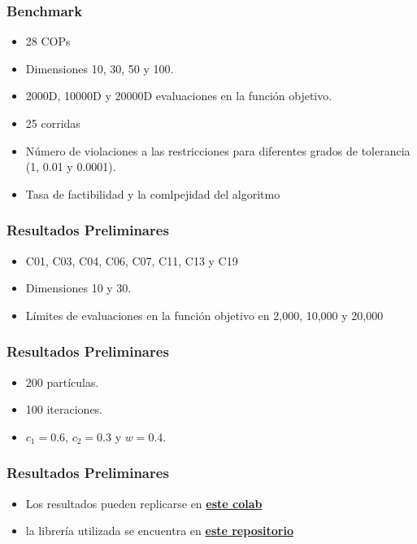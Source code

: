 \documentclass[10pt, compress]{beamer}
\begin{document}
\begin{frame}[fragile]
  \frametitle{Benchmark}
    \begin{center}
         \begin{itemize}
             \item 28 COPs
             \item Dimensiones 10, 30, 50 y 100.
             \item 2000D, 10000D y 20000D evaluaciones en la función objetivo.
             \item 25 corridas
             \item Número de violaciones a las restricciones para diferentes grados de tolerancia (1, 0.01 y 0.0001).
             \item Tasa de factibilidad y la comlpejidad del algoritmo
         \end{itemize}{}
    \end{center}{}
\end{frame}

\begin{frame}[fragile]
  \frametitle{Resultados Preliminares }
    \begin{center}
         \begin{itemize}
             \item C01, C03, C04, C06, C07, C11, C13 y C19
             \item Dimensiones 10 y 30. 
             \item Límites de evaluaciones en la función objetivo en 2,000, 10,000 y 20,000
         \end{itemize}{}
    \end{center}{}
\end{frame}

\begin{frame}[fragile]
  \frametitle{Resultados Preliminares}
    \begin{center}
         \begin{itemize}
             \item 200 partículas. 
             \item 100 iteraciones. 
             \item $c_1 = 0.6$, $c_2 = 0.3$ y $w = 0.4$.
         \end{itemize}{}
    \end{center}{}
\end{frame}

\begin{frame}[fragile]
  \frametitle{Resultados Preliminares}
    \begin{center}
         \begin{itemize}
             \item Los resultados pueden replicarse en \href{https://colab.research.google.com/github/arturomf94/PSO/blob/master/DTPSOCOP.ipynb}{\textbf{este colab}} 
             \item la librería utilizada se encuentra en \href{https://github.com/arturomf94/pyswarms}{\textbf{este repositorio}}
         \end{itemize}{}
    \end{center}{}
\end{frame}
\end{document}
